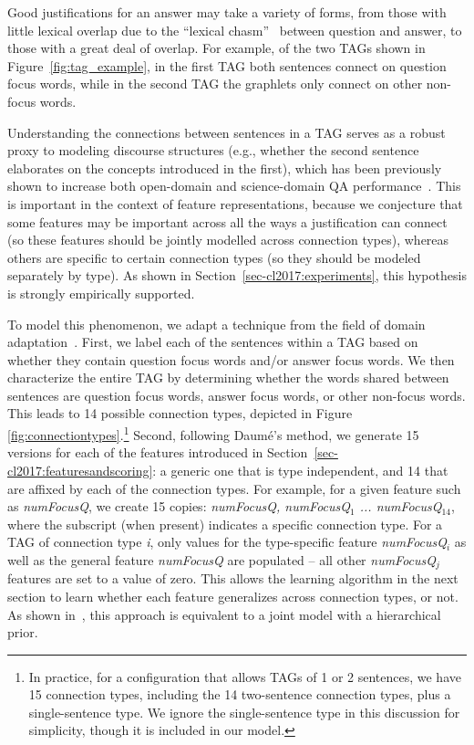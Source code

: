 Good justifications for an answer may take a variety of forms, from those with little lexical overlap due to the ``lexical chasm''~\citep{Berger:00} between question and answer, to those with a great deal of overlap. For example, of the two TAGs shown in Figure~\ref{fig:tag_example}, in the first TAG both sentences connect on question focus words, while in the second TAG the graphlets only connect on other non-focus words. 

Understanding the connections between sentences in a TAG serves as a robust proxy to modeling discourse structures (e.g., whether the second sentence elaborates on the concepts introduced in the first), which has been previously shown to increase both open-domain and science-domain QA performance~\citep{jansen14}.
This is important in the context of feature representations, because we conjecture that some features may be important across all the ways a justification can connect (so these features should be jointly modelled across connection types), whereas others are specific to certain connection types (so they should be modeled separately by type). As shown in Section~\ref{sec-cl2017:experiments}, this hypothesis is strongly empirically supported.

To model this phenomenon, we adapt a technique from the field of domain adaptation~\citep{daume2007}.
First, we label each of the sentences within a TAG based on whether they contain question focus words and/or answer focus words.  We then characterize the entire TAG by determining whether the words shared between sentences are question focus words, answer focus words, or other non-focus words.  This leads to 14 possible connection types, depicted in Figure \ref{fig:connectiontypes}.\footnote{In practice, for a configuration that allows TAGs of 1 or 2 sentences, we have 15 connection types, including the 14 two-sentence connection types, plus a single-sentence type. We ignore the single-sentence type in this discussion for simplicity, though it is included in our model.}
Second, following Daum{\'e}'s method, we generate 15 versions for each of the features introduced in Section~\ref{sec-cl2017:featuresandscoring}: a generic one that is type independent, and 14 that are affixed by each of the connection types. For example, for a given feature such as \emph{numFocusQ}, we create 15 copies: \emph{numFocusQ, numFocusQ$_1$ ... numFocusQ$_{14}$}, where the subscript (when present) indicates a specific connection type. For a TAG of connection type \emph{i}, only values for the type-specific feature \emph{numFocusQ$_i$} as well as the general feature \emph{numFocusQ} are populated -- all other \emph{numFocusQ$_j$} features are set to a value of zero. This allows the learning algorithm in the next section to learn whether each feature generalizes across connection types, or not. As shown in~\citep{finkel2010hierarchical}, this approach is equivalent to a joint model with a hierarchical prior. 



